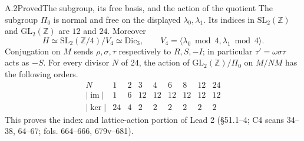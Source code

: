 \begin{statement}{A.2}{Proved}{The subgroup, its free basis, and the action of the quotient}
The subgroup $\Pi_0$ is normal and free on the displayed
$\lambda_0,\lambda_1$. Its indices in $\mathrm{SL}_2(\mathbb Z)$ and
$\mathrm{GL}_2(\mathbb Z)$ are $12$ and $24$. Moreover
\[
 H\simeq\mathrm{SL}_2(\mathbb Z/4)/V_4\simeq\mathrm{Dic}_3,
 \qquad V_4=\langle\lambda_0\bmod4,\lambda_1\bmod4\rangle.
\]
Conjugation on $M$ sends $\rho,\sigma,\tau$ respectively to $R,S,-I$;
in particular $\tau'=\omega\sigma\tau$ acts as $-S$.
For every divisor $N$ of $24$, the action of
$\mathrm{GL}_2(\mathbb Z)/\Pi_0$ on $M/NM$ has the following orders.
\[
\begin{array}{c|rrrrrrrr}
N&1&2&3&4&6&8&12&24\\\hline
|\operatorname{im}|&1&6&12&12&12&12&12&12\\
|\ker|&24&4&2&2&2&2&2&2
\end{array}
\]
This proves the index and lattice-action portion of Lead 2
(\S51.1--4; C4 scans 34--38, 64--67; fols. 664--666, 679v--681).
\end{statement}
